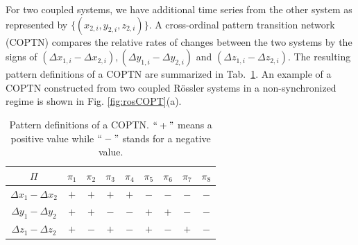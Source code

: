 		For two coupled systems, we have additional time series from the other system as represented by $\{(x_{2,i}, y_{2,i}, z_{2,i})\}$. A cross-ordinal pattern transition network (COPTN) compares the relative rates of changes between the two systems by the signs of $(\Delta x_{1,i} - \Delta x_{2,i}), (\Delta y_{1,i} - \Delta y_{2,i})$ and $(\Delta z_{1,i} - \Delta z_{2,i})$. The resulting pattern definitions of a COPTN are summarized in Tab.~\ref{tab:3DCOPT}. An example of a COPTN constructed from two coupled R\"ossler systems in a non-synchronized regime \cite{Guo2018} is shown in Fig. \ref{fig:rosCOPT}(a). 
\begin{table}[htb]
\centering
\begin{tabular}{|c|c|c|c|c|c|c|c|c|}
\hline
$\Pi$      & $\pi_1$ & $\pi_2$ & $\pi_3$ & $\pi_4$ & $\pi_5$ & $\pi_6$ & $\pi_7$
& $\pi_8$\\
\hline
$\Delta x_1 - \Delta x_2$ & $+ $ & $+ $ & $+$ & $+$ & $ - $ & $ - $ & $-$ & $ - $\\
\hline
$\Delta y_1 - \Delta y_2$ & $ + $ & $ + $ & $ -$ & $ -$ & $ + $ & $ + $ & $ -$ & $ -$\\
\hline
$\Delta z_1 - \Delta z_2$ & $ + $ & $ - $ & $ +$ & $ -$ & $ + $ & $ - $ & $+$ & $ -$\\
\hline
\end{tabular}
\caption{Pattern definitions of a COPTN. $``+"$ means a positive value while $``-"$ stands for a negative value.  \label{tab:3DCOPT}}
\end{table}

